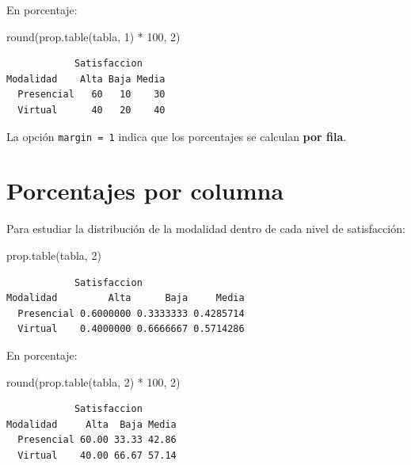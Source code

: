 \documentclass[
  spanish,
  14pt,
  letterpaper,
  DIV=11,
  numbers=noendperiod]{scrartcl}
\newenvironment{Shaded}{\begin{snugshade}}{\end{snugshade}}
\newcommand{\DecValTok}[1]{\textcolor[rgb]{0.68,0.51,1.00}{#1}}
\newcommand{\FunctionTok}[1]{\textcolor[rgb]{0.65,0.89,0.18}{#1}}
\newcommand{\NormalTok}[1]{\textcolor[rgb]{0.97,0.97,0.95}{#1}}
\newcommand{\SpecialCharTok}[1]{\textcolor[rgb]{0.68,0.51,1.00}{#1}}
\begin{document}
En porcentaje:

\begin{Shaded}
\begin{Highlighting}[]
\FunctionTok{round}\NormalTok{(}\FunctionTok{prop.table}\NormalTok{(tabla, }\DecValTok{1}\NormalTok{) }\SpecialCharTok{*} \DecValTok{100}\NormalTok{, }\DecValTok{2}\NormalTok{)}
\end{Highlighting}
\end{Shaded}

\begin{verbatim}
            Satisfaccion
Modalidad    Alta Baja Media
  Presencial   60   10    30
  Virtual      40   20    40
\end{verbatim}

La opción \texttt{margin\ =\ 1} indica que los porcentajes se calculan
\textbf{por fila}.

\section{Porcentajes por columna}\label{porcentajes-por-columna}

Para estudiar la distribución de la modalidad dentro de cada nivel de
satisfacción:

\begin{Shaded}
\begin{Highlighting}[]
\FunctionTok{prop.table}\NormalTok{(tabla, }\DecValTok{2}\NormalTok{)}
\end{Highlighting}
\end{Shaded}

\begin{verbatim}
            Satisfaccion
Modalidad         Alta      Baja     Media
  Presencial 0.6000000 0.3333333 0.4285714
  Virtual    0.4000000 0.6666667 0.5714286
\end{verbatim}

En porcentaje:

\begin{Shaded}
\begin{Highlighting}[]
\FunctionTok{round}\NormalTok{(}\FunctionTok{prop.table}\NormalTok{(tabla, }\DecValTok{2}\NormalTok{) }\SpecialCharTok{*} \DecValTok{100}\NormalTok{, }\DecValTok{2}\NormalTok{)}
\end{Highlighting}
\end{Shaded}

\begin{verbatim}
            Satisfaccion
Modalidad     Alta  Baja Media
  Presencial 60.00 33.33 42.86
  Virtual    40.00 66.67 57.14
\end{verbatim}
\end{document}
